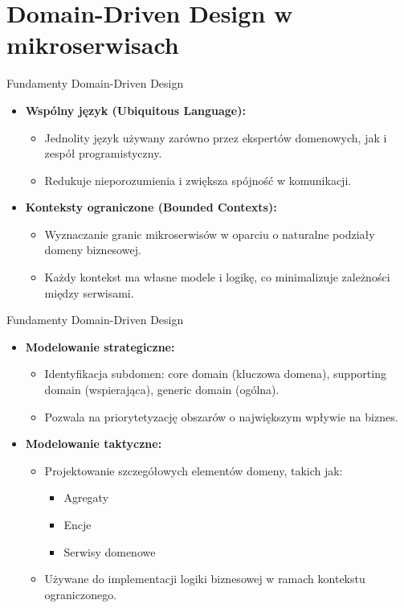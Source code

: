 \documentclass[aspectratio=169,xcolor=table]{beamer}
\begin{document}
\section{Domain-Driven Design w mikroserwisach}

\begin{frame}{Fundamenty Domain-Driven Design}
\begin{itemize}
    \item \textbf{Wspólny język (Ubiquitous Language):}
    \begin{itemize}
        \item Jednolity język używany zarówno przez ekspertów domenowych, jak i zespół programistyczny.
        \item Redukuje nieporozumienia i zwiększa spójność w komunikacji.
    \end{itemize}
    \vspace{0.3cm}
    \item \textbf{Konteksty ograniczone (Bounded Contexts):}
    \begin{itemize}
        \item Wyznaczanie granic mikroserwisów w oparciu o naturalne podziały domeny biznesowej.
        \item Każdy kontekst ma własne modele i logikę, co minimalizuje zależności między serwisami.
    \end{itemize}
    \vspace{0.3cm}
\end{itemize}
\end{frame}
\begin{frame}{Fundamenty Domain-Driven Design}
\begin{itemize}
    \item \textbf{Modelowanie strategiczne:}
    \begin{itemize}
        \item Identyfikacja subdomen: core domain (kluczowa domena), supporting domain (wspierająca), generic domain (ogólna).
        \item Pozwala na priorytetyzację obszarów o największym wpływie na biznes.
    \end{itemize}
    \vspace{0.3cm}
    \item \textbf{Modelowanie taktyczne:}
    \begin{itemize}
        \item Projektowanie szczegółowych elementów domeny, takich jak:
        \begin{itemize}
            \item Agregaty
            \item Encje
            \item Serwisy domenowe
        \end{itemize}
        \item Używane do implementacji logiki biznesowej w ramach kontekstu ograniczonego.
    \end{itemize}
\end{itemize}
\end{frame}
\end{document}

